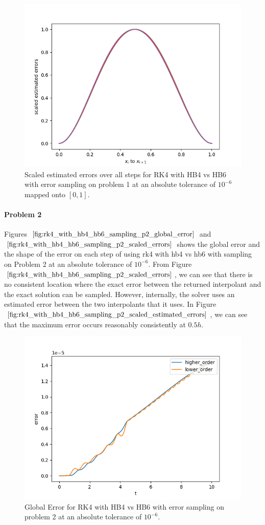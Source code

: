 \begin{figure}[H]
\centering
\includegraphics[width=0.7\linewidth]{./figures/rk4_with_hb4_hb6_sampling_p1_scaled_estimated_errors}
\caption{Scaled estimated errors over all steps for RK4 with HB4 vs HB6 with error sampling on problem 1 at an absolute tolerance of $10^{-6}$ mapped onto $[0, 1]$.}
\label{fig:rk4_with_hb4_hb6_sampling_p1_scaled_estimated_errors}
\end{figure}

\paragraph{Problem 2} Figures $\ref{fig:rk4_with_hb4_hb6_sampling_p2_global_error}$ and $\ref{fig:rk4_with_hb4_hb6_sampling_p2_scaled_errors}$ shows the global error and the shape of the error on each step of using rk4 with hb4 vs hb6 with sampling on Problem 2 at an absolute tolerance of $10^{-6}$. From Figure $\ref{fig:rk4_with_hb4_hb6_sampling_p2_scaled_errors}$, we can see that there is no consistent location where the exact error between the returned interpolant and the exact solution can be sampled. However, internally, the solver uses an estimated error between the two interpolants that it uses. In Figure $\ref{fig:rk4_with_hb4_hb6_sampling_p2_scaled_estimated_errors}$, we can see that the maximum error occurs reasonably consistently at $0.5h$.

\begin{figure}[H]
\centering
\includegraphics[width=0.7\linewidth]{./figures/rk4_with_hb4_hb6_sampling_p2_global_error}
\caption{Global Error for RK4 with HB4 vs HB6 with error sampling on problem 2 at an absolute tolerance of $10^{-6}$.}
\label{fig:rk4_with_hb4_hb6_sampling_p2_global_error}
\end{figure}

